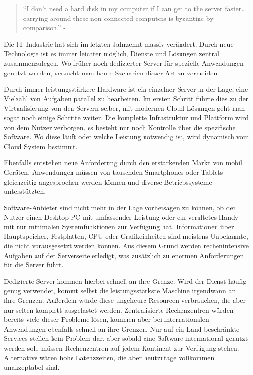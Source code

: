 \begin{quotation}
	``I don’t need a hard disk in my computer if I can get to the server faster… carrying around these non-connected computers is byzantine by comparison.'' - \parencite{jobs.1997}
\end{quotation}

Die IT-Industrie hat sich im letzten Jahrzehnt massiv verändert. Durch neue Technologie ist es immer leichter möglich, Dienste und Lösungen zentral zusammenzulegen. Wo früher noch dedizierter Server für spezielle Anwendungen genutzt wurden, versucht man heute Szenarien dieser Art zu vermeiden.

Durch immer leistungsstärkere Hardware ist ein einzelner Server in der Lage, eine Vielzahl von Aufgaben parallel zu bearbeiten. Im ersten Schritt führte dies zu der Virtualisierung von den Servern selber, mit modernen Cloud Lösungen geht man sogar noch einige Schritte weiter. Die komplette Infrastruktur und Plattform wird von dem Nutzer verborgen, es besteht nur noch Kontrolle über die spezifische Software. Wo diese läuft oder welche Leistung notwendig ist, wird dynamisch vom Cloud System bestimmt.

Ebenfalls entstehen neue Anforderung durch den erstarkenden Markt von mobil Geräten. Anwendungen müssen von tausenden Smartphones oder Tablets gleichzeitig angesprochen werden können und diverse Betriebssysteme unterstützten. 

Software-Anbieter sind nicht mehr in der Lage vorhersagen zu können, ob der Nutzer einen Desktop PC mit umfassender Leistung oder ein veraltetes Handy mit nur minimalen Systemfunktionen zur Verfügung hat. Informationen über Hauptspeicher, Festplatten, CPU oder Grafikeinheiten sind meistens Unbekannte, die nicht vorausgesetzt werden können. Aus diesem Grund werden rechenintensive Aufgaben auf der Serverseite erledigt, was zusätzlich zu enormen Anforderungen für die Server führt.

Dedizierte Server kommen hierbei schnell an ihre Grenze. Wird der Dienst häufig genug verwendet, kommt selbst die leistungsstärkste Maschine irgendwann an ihre Grenzen. Außerdem würde diese ungeheure Resourcen verbrauchen, die aber nur selten komplett ausgelastet werden. 
Zentralisierte Rechenzentren würden bereits viele dieser Probleme lösen, kommen aber bei internationalen Anwendungen ebenfalls schnell an ihre Grenzen. Nur auf ein Land beschränkte Services stellen kein Problem dar, aber sobald eine Software international genutzt werden soll, müssen Rechenzentren auf jedem Kontinent zur Verfügung stehen. Alternative wären hohe Latenzzeiten, die aber heutzutage vollkommen unakzeptabel sind.

